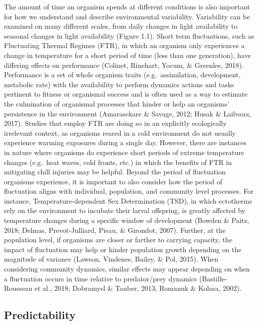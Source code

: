 \documentclass[12pt,twoside]{reedthesis}
\begin{document}
The amount of time an organism spends at different conditions is also important for how we understand and describe environmental variability. Variability can be examined on many different scales, from daily changes in light availability to seasonal changes in light availability (Figure 1.1). Short term fluctuations, such as Fluctuating Thermal Regimes (FTR), in which an organism only experiences a change in temperature for a short period of time (less than one generation), have differing effects on performance (Colinet, Rinehart, Yocum, \& Greenlee, 2018). Performance is a set of whole organism traits (e.g.~assimilation, development, metabolic rate) with the availability to perform dynamics actions and tasks pertinent to fitness or organismal success and is often used as a way to estimate the culmination of organismal processes that hinder or help an organisms' persistence in the environment (Amarasekare \& Savage, 2012; Husak \& Lailvaux, 2017). Studies that employ FTR are doing so in an explicitly ecologically irrelevant context, as organisms reared in a cold environment do not usually experience warming exposures during a single day. However, there are instances in nature where organisms do experience short periods of extreme temperature changes (e.g.~heat waves, cold fronts, etc.) in which the benefits of FTR in mitigating chill injuries may be helpful. Beyond the period of fluctuation organisms experience, it is important to also consider how the period of fluctuation aligns with individual, population, and community level processes. For instance, Temperature-dependent Sex Determination (TSD), in which ectotherms rely on the environment to incubate their larval offspring, is greatly affected by temperature changes during a specific window of development (Bowden \& Paitz, 2018; Delmas, Prevot-Julliard, Pieau, \& Girondot, 2007). Further, at the population level, if organisms are closer or farther to carrying capacity, the impact of fluctuation may help or hinder population growth depending on the magnitude of variance (Lawson, Vindenes, Bailey, \& Pol, 2015). When considering community dynamics, similar effects may appear depending on when a fluctuation occurs in time relative to predator/prey dynamics (Bastille-Rousseau et al., 2018; Dobramysl \& Tauber, 2013; Romanuk \& Kolasa, 2002).

\hypertarget{predictability}{%
\subsection{Predictability}\label{predictability}}
\end{document}
